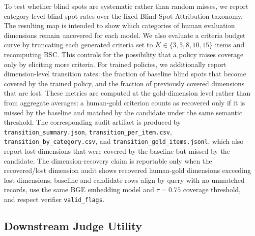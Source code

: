 To test whether blind spots are systematic rather than random misses, we report
category-level blind-spot rates over the fixed Blind-Spot Attribution taxonomy.
The resulting map is intended to show which categories of human evaluation
dimensions remain uncovered for each model. We also evaluate a criteria budget
curve by truncating
each generated criteria set to $K \in \{3,5,8,10,15\}$ items and recomputing BSC.
This controls for the possibility that a policy raises coverage only by
eliciting more criteria. For trained policies, we additionally report
dimension-level transition rates: the fraction of baseline blind spots that
become covered by the trained policy, and the fraction of previously covered
dimensions that are lost. These metrics are computed at the gold-dimension
level rather than from aggregate averages: a human-gold criterion counts as
recovered only if it is missed by the baseline and matched by the candidate
under the same semantic threshold. The corresponding audit artifact is produced by
\texttt{transition\_summary.json}, \texttt{transition\_per\_item.csv},
\texttt{transition\_by\_category.csv}, and
\texttt{transition\_gold\_items.jsonl}, which also report lost dimensions that
were covered by the baseline but missed by the candidate. The
dimension-recovery claim is reportable only when the recovered/lost dimension
audit shows recovered human-gold dimensions exceeding lost dimensions, baseline
and candidate rows align by query with no unmatched records, use the same BGE embedding model and
$\tau=0.75$ coverage threshold, and respect verifier \texttt{valid\_flags}.

\subsection{Downstream Judge Utility}

